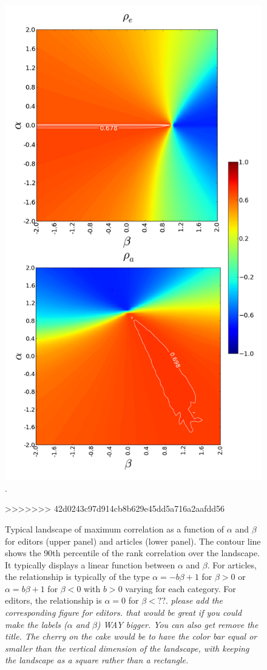\begin{figure}[!t]
\includegraphics[width=0.9\columnwidth]{Figures/contour_fem_combined.png}.
\caption{Typical landscape of maximum correlation as a function of $\alpha$ and $\beta$ for editors (upper panel) and articles (lower panel). The contour line shows the 90th percentile of the rank correlation over the landscape. It typically displays a linear function between $\alpha$ and $\beta$. For articles, the relationship is typically of the type $\alpha = - b \beta + 1$ for $\beta >0$ or $\alpha = b \beta + 1$ for $\beta < 0$ with $b>0$ varying for each category. For editors, the relationship is $\alpha = 0$ for $\beta < ??$. {\it please add the corresponding figure for editors.  that would be great if you could make the labels ($\alpha$ and $\beta$) WAY bigger. You can also get remove the title. The cherry on the cake would be to have the color bar equal or smaller than the vertical dimension of the landscape, with keeping the landscape as a square rather than a rectangle.}}
\label{fig:landscape}
>>>>>>> 42d0243c97d914cb8b629e45dd5a716a2aafdd56
\end{figure}

	



